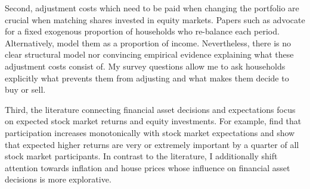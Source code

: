 \documentclass[ProjectABM]{subfiles}
\begin{document}
Second, adjustment costs which need to be paid when changing the portfolio are crucial when matching shares invested in equity markets. Papers such as \cite{giglio_et_al_2019five} advocate for a fixed exogenous proportion of households who re-balance each period. Alternatively,  \cite{bonaparte_et_al_2012adjustment} model them as a proportion of income. Nevertheless, there is no clear structural model nor convincing empirical evidence explaining what these adjustment costs consist of. My survey questions allow me to ask households explicitly what prevents them from adjusting and what makes them decide to buy or sell.

Third, the literature connecting financial asset decisions and expectations focus on expected stock market returns and equity investments. For example, \cite{arrondel_et_al_2014subjective_return_expectation} find that participation increases monotonically with stock market expectations and \cite{choi_2020} show that expected higher returns are very or extremely important by a quarter of all stock market participants. %
In contrast to the literature, I additionally shift attention towards inflation and house prices whose influence on financial asset decisions is more explorative. %

\end{document}
